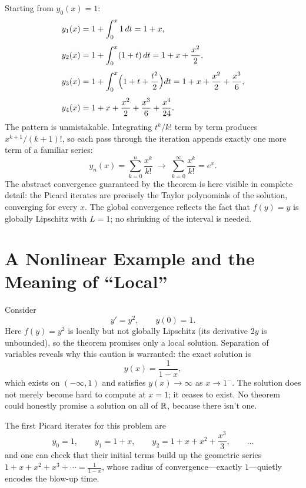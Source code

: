 \documentclass{essay}
\begin{document}
Starting from \(y_{0}(x) = 1\):
\begin{align*}
  y_{1}(x) &= 1 + \int_{0}^{x} 1 \, dt = 1 + x, \\[4pt]
  y_{2}(x) &= 1 + \int_{0}^{x} (1 + t)\, dt = 1 + x + \frac{x^{2}}{2}, \\[4pt]
  y_{3}(x) &= 1 + \int_{0}^{x} \Bigl( 1 + t + \frac{t^{2}}{2} \Bigr) dt = 1 + x + \frac{x^{2}}{2} + \frac{x^{3}}{6}, \\[4pt]
  y_{4}(x) &= 1 + x + \frac{x^{2}}{2} + \frac{x^{3}}{6} + \frac{x^{4}}{24}.
\end{align*}
The pattern is unmistakable. Integrating \(t^{k}/k!\) term by term produces \(x^{k+1}/(k+1)!\), so each pass through the iteration appends exactly one more term of a familiar series:
\[ y_{n}(x) = \sum_{k=0}^{n} \frac{x^{k}}{k!} \;\longrightarrow\; \sum_{k=0}^{\infty} \frac{x^{k}}{k!} = e^{x}. \]
The abstract convergence guaranteed by the theorem is here visible in complete detail: the Picard iterates are precisely the Taylor polynomials of the solution, converging for every \(x\). The global convergence reflects the fact that \(f(y) = y\) is globally Lipschitz with \(L = 1\); no shrinking of the interval is needed.

\section{A Nonlinear Example and the Meaning of ``Local''}

\begin{example}
  \label{ex:blowup}
  Consider
  \[ y' = y^{2}, \qquad y(0) = 1. \]
  Here \(f(y) = y^{2}\) is locally but not globally Lipschitz (its derivative \(2y\) is unbounded), so the theorem promises only a local solution. Separation of variables reveals why this caution is warranted: the exact solution is
  \[ y(x) = \frac{1}{1 - x}, \]
  which exists on \((-\infty, 1)\) and satisfies \(y(x) \to \infty\) as \(x \to 1^{-}\). The solution does not merely become hard to compute at \(x = 1\); it ceases to exist. No theorem could honestly promise a solution on all of \(\mathbb{R}\), because there isn't one.

  The first Picard iterates for this problem are
  \[ y_{0} = 1, \qquad y_{1} = 1 + x, \qquad y_{2} = 1 + x + x^{2} + \frac{x^{3}}{3}, \qquad \ldots \]
  and one can check that their initial terms build up the geometric series \(1 + x + x^{2} + x^{3} + \cdots = \frac{1}{1-x}\), whose radius of convergence---exactly \(1\)---quietly encodes the blow-up time.
\end{example}
\end{document}
